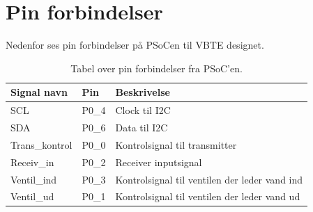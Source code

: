 \section{Pin forbindelser}
Nedenfor ses pin forbindelser på PSoCen til VBTE designet.
\begin{table}[H]
\begin{tabular}{|p{3cm}|p{2cm}|p{8.5cm}|} \hline
\cellcolor[gray]{0.85}Signal navn& \cellcolor[gray]{0.85}Pin &\cellcolor[gray]{0.85}\cellcolor[gray]{0.85}Beskrivelse\\ \hline
SCL & P0\_4 & Clock til I2C \\ \hline
SDA & P0\_6 & Data til I2C \\ \hline
Trans\_kontrol & P0\_0 & Kontrolsignal til transmitter\\ \hline
Receiv\_in & P0\_2 & Receiver inputsignal\\ \hline
Ventil\_ind & P0\_3 & Kontrolsignal til ventilen der leder vand ind\\ \hline
Ventil\_ud & P0\_1 & Kontrolsignal til ventilen der leder vand ud\\ \hline

\end{tabular}
\caption{Tabel over pin forbindelser fra PSoC'en.}
\label{table:VBTEpinforbindelser}
\end{table}